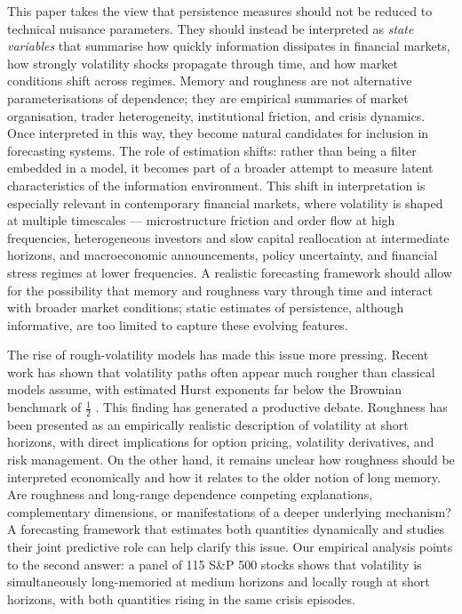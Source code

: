 \documentclass[11pt,a4paper]{article}
\begin{document}
This paper takes the view that persistence measures should not be reduced
to technical nuisance parameters. They should instead be interpreted as
\emph{state variables} that summarise how quickly information dissipates in
financial markets, how strongly volatility shocks propagate through time,
and how market conditions shift across regimes. Memory and roughness are not
alternative parameterisations of dependence; they are empirical summaries of
market organisation, trader heterogeneity, institutional friction, and
crisis dynamics. Once interpreted in this way, they become natural
candidates for inclusion in forecasting systems. The role of estimation
shifts: rather than being a filter embedded in a model, it becomes part of
a broader attempt to measure latent characteristics of the information
environment. This shift in interpretation is especially relevant in
contemporary financial markets, where volatility is shaped at multiple
timescales --- microstructure friction and order flow at high frequencies,
heterogeneous investors and slow capital reallocation at intermediate
horizons, and macroeconomic announcements, policy uncertainty, and
financial stress regimes at lower frequencies. A realistic forecasting
framework should allow for the possibility that memory and roughness vary
through time and interact with broader market conditions; static estimates
of persistence, although informative, are too limited to capture these
evolving features.

The rise of rough-volatility models has made this issue more pressing.
Recent work has shown that volatility paths often appear much rougher than
classical models assume, with estimated Hurst exponents far below the
Brownian benchmark of $\tfrac12$
\citep{gatheral2018volatility,bennedsen2021decoupling}. This finding has
generated a productive debate. Roughness has been presented as an
empirically realistic description of volatility at short horizons, with
direct implications for option pricing, volatility derivatives, and risk
management. On the other hand, it remains unclear how roughness should be
interpreted economically and how it relates to the older notion of long
memory. Are roughness and long-range dependence competing explanations,
complementary dimensions, or manifestations of a deeper underlying
mechanism? A forecasting framework that estimates both quantities
dynamically and studies their joint predictive role can help clarify this
issue. Our empirical analysis points to the second answer: a panel of 115
S\&P 500 stocks shows that volatility is simultaneously long-memoried at
medium horizons and locally rough at short horizons, with both quantities
rising in the same crisis episodes.
\end{document}
